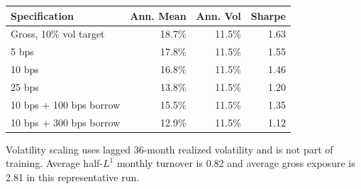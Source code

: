 \begin{threeparttable}
\begin{tabular}{lrrr}
\toprule
Specification & Ann. Mean & Ann. Vol & Sharpe \\
\midrule
Gross, 10\% vol target & 18.7\% & 11.5\% & 1.63 \\
5 bps & 17.8\% & 11.5\% & 1.55 \\
10 bps & 16.8\% & 11.5\% & 1.46 \\
25 bps & 13.8\% & 11.5\% & 1.20 \\
10 bps + 100 bps borrow & 15.5\% & 11.5\% & 1.35 \\
10 bps + 300 bps borrow & 12.9\% & 11.5\% & 1.12 \\
\bottomrule
\end{tabular}
\begin{tablenotes}\footnotesize\item Volatility scaling uses lagged 36-month realized volatility and is not part of training. Average half-$L^1$ monthly turnover is 0.82 and average gross exposure is 2.81 in this representative run.\end{tablenotes}
\end{threeparttable}
